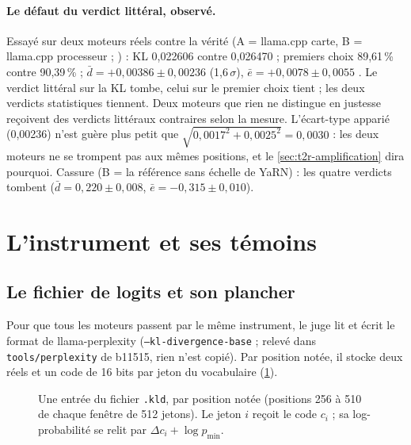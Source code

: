 \paragraph{Le défaut du verdict littéral, observé.} Essayé sur deux moteurs réels contre la vérité (A = llama.cpp carte, B = llama.cpp processeur ; ) : KL 0,022606 contre 0,026470 ; premiers choix 89,61\,\% contre 90,39\,\% ; $\bar d = +0{,}00386 \pm 0{,}00236$ (1,6\,$\sigma$), $\bar e = +0{,}0078 \pm 0{,}0055$ \mes. Le verdict littéral sur la KL tombe, celui sur le premier choix tient ; les deux verdicts statistiques tiennent. Deux moteurs que rien ne distingue en justesse reçoivent des verdicts littéraux contraires selon la mesure. L'écart-type apparié (0,00236) n'est guère plus petit que $\sqrt{0{,}0017^2 + 0{,}0025^2} = 0{,}0030$ : les deux moteurs ne se trompent pas aux mêmes positions, et le \cref{sec:t2r-amplification} dira pourquoi. Cassure (B = la référence sans échelle de YaRN) : les quatre verdicts tombent ($\bar d = 0{,}220 \pm 0{,}008$, $\bar e = -0{,}315 \pm 0{,}010$).

\section{L'instrument et ses témoins}\label{sec:t2r-instrument}

\subsection{Le fichier de logits et son plancher}\label{sec:t2r-kld}

Pour que tous les moteurs passent par le même instrument, le juge lit et écrit le format de llama-perplexity (\texttt{--kl-divergence-base} ; relevé dans \texttt{tools/perplexity} de b11515, rien n'est copié). Par position notée, il stocke deux réels et un code de 16 bits par jeton du vocabulaire (\cref{fig:t2r-kld}).

\begin{figure}[ht]
\centering
\SchemaRefKld
\caption[Une entrée du fichier .kld au bit près]{Une entrée du fichier \texttt{.kld}, par position notée (positions 256 à 510 de chaque fenêtre de 512 jetons). Le jeton $i$ reçoit le code $c_i$ ; sa log-probabilité se relit par $\Delta c_i + \log p_{\min}$.}
\label{fig:t2r-kld}
\end{figure}

